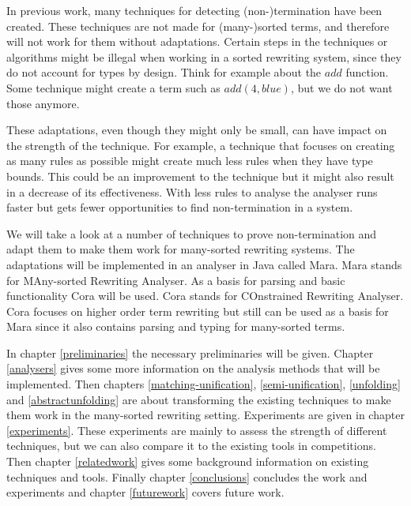 In previous work, many techniques for detecting (non-)termination have been created. These techniques are not made for (many-)sorted terms, and therefore will not work for them without adaptations. Certain steps in the techniques or algorithms might be illegal when working in a sorted rewriting system, since they do not account for types by design. Think for example about the $add$ function. Some technique might create a term such as $add(4, blue)$, but we do not want those anymore. 

These adaptations, even though they might only be small, can have impact on the strength of the technique. For example, a technique that focuses on creating as many rules as possible might create much less rules when they have type bounds. This could be an improvement to the technique but it might also result in a decrease of its effectiveness. With less rules to analyse the analyser runs faster but gets fewer opportunities to find non-termination in a system. 

We will take a look at a number of techniques to prove non-termination and adapt them to make them work for many-sorted rewriting systems. The adaptations will be implemented in an analyser in Java called Mara. Mara stands for MAny-sorted Rewriting Analyser. As a basis for parsing and basic functionality Cora will be used. Cora stands for COnstrained Rewriting Analyser. Cora focuses on higher order term rewriting but still can be used as a basis for Mara since it also contains parsing and typing for many-sorted terms. 

In chapter \ref{preliminaries} the necessary preliminaries will be given. Chapter \ref{analysers} gives some more information on the analysis methods that will be implemented. Then chapters \ref{matching-unification}, \ref{semi-unification}, \ref{unfolding} and \ref{abstractunfolding} are about transforming the existing techniques to make them work in the many-sorted rewriting setting. Experiments are given in chapter \ref{experiments}. These experiments are mainly to  assess the strength of different techniques, but we can also compare it to the existing tools in competitions. Then chapter \ref{relatedwork} gives some background information on existing techniques and tools. Finally chapter \ref{conclusions} concludes the work and experiments and chapter \ref{futurework} covers future work. 